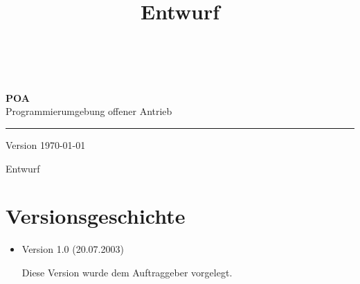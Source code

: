 \documentclass[a4paper,titlepage,12pt,ngerman]{scrbook}
\title {\huge \product\\[0.5cm]\large Entwurf\\[0.5cm] \version
  \\[1cm] \Large \company}
\newcommand\version{Version \today \xspace}
\begin{document}

\begin{titlepage}
\renewcommand{\thefootnote}{\fnsymbol{footnote}}
{\Huge
\raggedright
\textbf{POA} \\
\huge Programmierumgebung offener Antrieb
\rule{\textwidth}{0.75pt}
\par
}
\begin{flushleft}
\normalsize
\version
\end{flushleft}
\vfill

{\parindent=0cm
\Huge Entwurf
}


\setcounter{footnote}{0}
\end{titlepage}


\section*{Versionsgeschichte}

\begin{itemize}

\item Version 1.0 (20.07.2003)

  Diese Version wurde dem Auftraggeber vorgelegt.

\end{itemize}


\tableofcontents









\appendix
\end{document}
